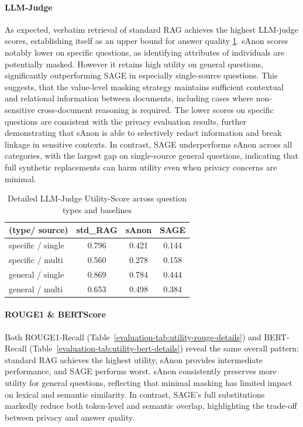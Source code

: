 \paragraph{LLM-Judge}
As expected, verbatim retrieval of standard RAG achieves the highest LLM-judge scores, establishing itself as an upper bound for answer quality \ref{evaluation-tab:utility-llm-details}. sAnon scores notably lower on specific questions, as identifying attributes of individuals are potentially masked.
However it retains high utility on general questions, significantly outperforming SAGE in especially single-source questions.
This suggests, that the value-level masking strategy maintains sufficient contextual and relational information between documents, including cases where non-sensitive cross-document reasoning is required. The lower scores on specific questions are consistent with the privacy evaluation results, further demonstrating that sAnon is able to selectively redact information and break linkage in sensitive contexts.
In contrast, SAGE underperforms sAnon across all categories, with the largest gap on single-source general questions, indicating that full synthetic replacements can harm utility even when privacy concerns are minimal.

\begin{table}[h!]
\centering
\caption{Detailed LLM-Judge Utility-Score across question types and baselines}
\label{evaluation-tab:utility-llm-details}
\begin{tabular}{l c c c}
\toprule
\textbf{(type/ source)} & \textbf{std\_RAG} & \textbf{sAnon} & \textbf{SAGE} \\
\midrule
specific / single & 0.796 & 0.421 & 0.144 \\
specific / multi & 0.560 & 0.278 & 0.158 \\
general / single & 0.869 & 0.784 & 0.444 \\
general / multi & 0.653 & 0.498 & 0.384 \\
\bottomrule
\end{tabular}
\end{table}


\paragraph{ROUGE1 \& BERTScore}
Both ROUGE1-Recall (Table~\ref{evaluation-tab:utility-rouge-details}) and BERT-Recall (Table~\ref{evaluation-tab:utility-bert-details}) reveal the same overall pattern: standard RAG achieves the highest utility, sAnon provides intermediate performance, and SAGE performs worst. sAnon consistently preserves more utility for general questions, reflecting that minimal masking has limited impact on lexical and semantic similarity. In contrast, SAGE's full substitutions markedly reduce both token-level and semantic overlap, highlighting the trade-off between privacy and answer quality.

